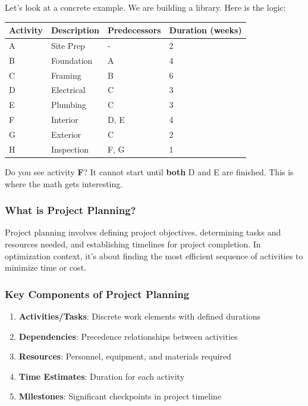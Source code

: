 \documentclass[
  letterpaper,
  DIV=11,
  numbers=noendperiod]{scrreprt}
\providecommand{\tightlist}{%
  \setlength{\itemsep}{0pt}\setlength{\parskip}{0pt}}
\begin{document}
Let's look at a concrete example. We are building a library. Here is the
logic:

\begin{longtable}[]{@{}llll@{}}
\toprule\noalign{}
Activity & Description & Predecessors & Duration (weeks) \\
\midrule\noalign{}
\endhead
\bottomrule\noalign{}
\endlastfoot
A & Site Prep & - & 2 \\
B & Foundation & A & 4 \\
C & Framing & B & 6 \\
D & Electrical & C & 3 \\
E & Plumbing & C & 3 \\
F & Interior & D, E & 4 \\
G & Exterior & C & 2 \\
H & Inspection & F, G & 1 \\
\end{longtable}

Do you see activity \textbf{F}? It cannot start until \textbf{both} D
and E are finished. This is where the math gets interesting.

\subsubsection{What is Project
Planning?}\label{what-is-project-planning}

Project planning involves defining project objectives, determining tasks
and resources needed, and establishing timelines for project completion.
In optimization context, it's about finding the most efficient sequence
of activities to minimize time or cost.

\subsubsection{Key Components of Project
Planning}\label{key-components-of-project-planning}

\begin{enumerate}
\def\labelenumi{\arabic{enumi}.}
\tightlist
\item
  \textbf{Activities/Tasks}: Discrete work elements with defined
  durations
\item
  \textbf{Dependencies}: Precedence relationships between activities
\item
  \textbf{Resources}: Personnel, equipment, and materials required
\item
  \textbf{Time Estimates}: Duration for each activity
\item
  \textbf{Milestones}: Significant checkpoints in project timeline
\end{enumerate}
\end{document}

